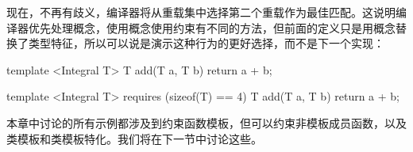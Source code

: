 现在，不再有歧义，编译器将从重载集中选择第二个重载作为最佳匹配。这说明编译器优先处理概念，使用概念使用约束有不同的方法，但前面的定义只是用概念替换了类型特征，所以可以说是演示这种行为的更好选择，而不是下一个实现：

\begin{cpp}
template <Integral T>
T add(T a, T b)
{
	return a + b;
}

template <Integral T>
requires (sizeof(T) == 4)
T add(T a, T b)
{
	return a + b;
}
\end{cpp}

本章中讨论的所有示例都涉及到约束函数模板，但可以约束非模板成员函数，以及类模板和类模板特化。我们将在下一节中讨论这些。





























